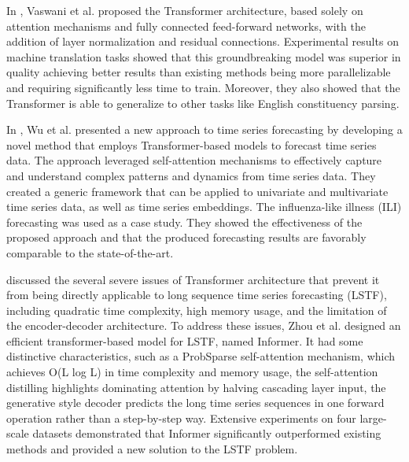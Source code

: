 In \cite{Vaswani2017}, Vaswani et al. proposed the Transformer architecture, based solely on attention mechanisms and fully connected feed-forward networks, with the addition of layer normalization and residual connections.
Experimental results on machine translation tasks showed that this groundbreaking model was superior in quality achieving better results than existing methods being more parallelizable and requiring significantly less time to train.
Moreover, they also showed that the Transformer is able to generalize to other tasks like English constituency parsing.

In \cite{Wu2020}, Wu et al. presented a new approach to time series forecasting by developing a novel method that employs Transformer-based models to forecast time series data.
The approach leveraged self-attention mechanisms to effectively capture and understand complex patterns and dynamics from time series data.
They created a generic framework that can be applied to univariate and multivariate time series data, as well as time series embeddings.
The influenza-like illness (ILI) forecasting was used as a case study.
They showed the effectiveness of the proposed approach and that the produced forecasting results are favorably comparable to the state-of-the-art.

\cite{Zhou2020} discussed the several severe issues of Transformer architecture that prevent it from being directly applicable to long sequence time series forecasting (LSTF), including quadratic time complexity, high memory usage, and the limitation of the encoder-decoder architecture.
To address these issues, Zhou et al. designed an efficient transformer-based model for LSTF, named Informer.
It had some distinctive characteristics, such as a ProbSparse self-attention mechanism, which achieves O(L log L) in time complexity and memory usage, the self-attention distilling highlights dominating attention by halving cascading layer input, the generative style decoder predicts the long time series sequences in one forward operation rather than a step-by-step way.
Extensive experiments on four large-scale datasets demonstrated that Informer significantly outperformed existing methods and provided a new solution to the LSTF problem.

